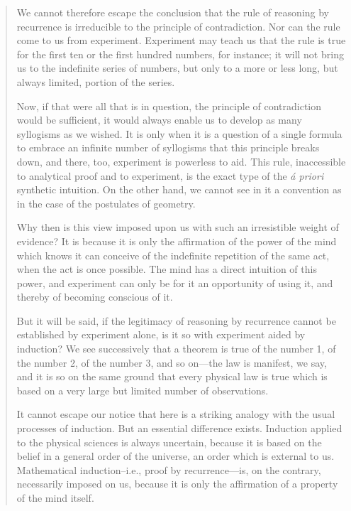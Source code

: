 \begin{quote}
    We cannot therefore escape the conclusion that the rule of reasoning by recurrence is irreducible to the principle of contradiction.  Nor can the rule come to us from experiment.  Experiment may teach us that the rule is true for the first ten or the first hundred numbers, for instance; it will not bring us to the indefinite series of numbers, but only to a more or less long, but always limited, portion of the series.  
    
    Now, if that were all that is in question, the principle of contradiction would be sufficient, it would always enable us to develop as many syllogisms as we wished.  It is only when it is a question of a single formula to embrace an infinite number of syllogisms that this principle breaks down, and there, too, experiment is powerless to aid.  This rule, inaccessible to analytical proof and to experiment, is the exact type of the \emph{\'a priori} synthetic intuition.  On the other hand, we cannot see in it a convention as in the case of the postulates of geometry.
    
    Why then is this view imposed upon us with such an irresistible weight of evidence?  It is because it is only the affirmation of the power of the mind which knows it can conceive of the indefinite repetition of the same act, when the act is once possible.  The mind has a direct intuition of this power, and experiment can only be for it an opportunity of using it, and thereby of becoming conscious of it. 
    
    But it will be said, if the legitimacy of reasoning by recurrence cannot be established by experiment alone, is it so with experiment aided by induction?  We see successively that a theorem is true of the number 1, of the number 2, of the number 3, and so on---the law is manifest, we say, and it is so on the same ground that every physical law is true which is based on a very large but limited number of observations.
    
    It cannot escape our notice that here is a striking analogy with the usual processes of induction.  But an essential difference exists.  Induction applied to the physical sciences is always uncertain, because it is based on the belief in a general order of the universe, an order which is external to us.  Mathematical induction--i.e., proof by recurrence---is, on the contrary, necessarily imposed on us, because it is only the affirmation of a property of the mind itself.\citep[p. 12-13]{Poincare1952}
\end{quote}

